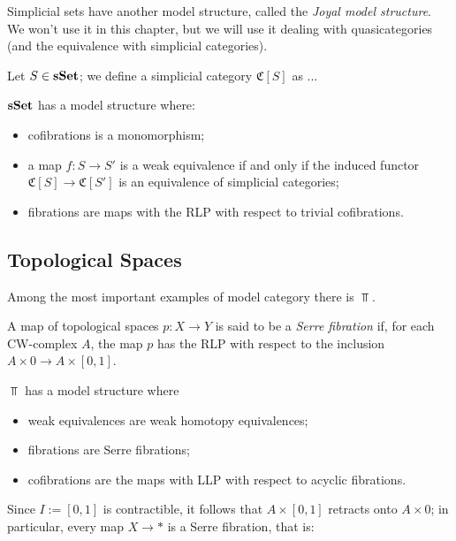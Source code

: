 Simplicial sets have another model structure, called the \emph{Joyal model structure}. We won't use it in this chapter, but we will use it dealing with quasicategories (and the equivalence with simplicial categories).

\begin{defin}
Let $S \in \mathbf{sSet}$; we define a simplicial category $\mathfrak C[S]$ as ...
\end{defin}

\begin{thm} \label{thm joyal model structure}
$\mathbf{sSet}$ has a model structure where:
\begin{itemize}
\item cofibrations is a monomorphism;
\item a map $f \colon S \to S'$ is a weak equivalence if and only if the induced functor $\mathfrak C[S] \to \mathfrak C[S']$ is an equivalence of simplicial categories;
\item fibrations are maps with the RLP with respect to trivial cofibrations.
\end{itemize}
\end{thm}

\subsection{Topological Spaces}

Among the most important examples of model category there is $\Top$.

\begin{defin}
A map of topological spaces $p \colon X \to Y$ is said to be a \emph{Serre fibration} if, for each CW-complex $A$, the map $p$ has the RLP with respect to the inclusion $A \times 0 \to A \times [0,1]$.
\end{defin}

\begin{thm} \label{thm model structure top}
$\Top$ has a model structure where
\begin{itemize}
\item weak equivalences are weak homotopy equivalences;
\item fibrations are Serre fibrations;
\item cofibrations are the maps with LLP with respect to acyclic fibrations.
\end{itemize}
\end{thm}

Since $I := [0,1]$ is contractible, it follows that $A \times [0,1]$ retracts onto $A \times 0$; in particular, every map $X \to *$ is a Serre fibration, that is:

